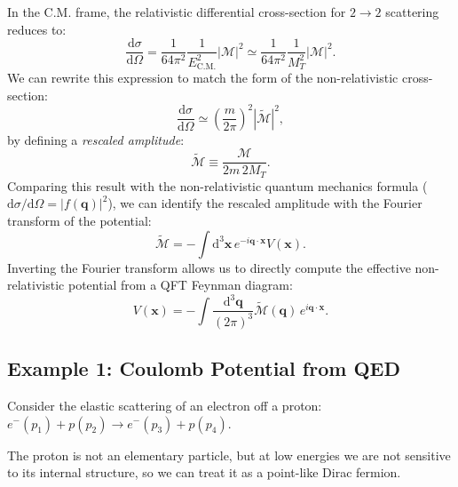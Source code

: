 In the C.M. frame, the relativistic differential cross-section for $2 \to 2$ scattering reduces to:
\[
    \frac{\mathrm{d}\sigma}{\mathrm{d}\Omega} = \frac{1}{64\pi^2} \frac{1}{E_{\text{C.M.}}^2} |\mathcal{M}|^2 \simeq \frac{1}{64\pi^2} \frac{1}{M_T^2} |\mathcal{M}|^2.
\]
We can rewrite this expression to match the form of the non-relativistic cross-section:
\[
    \frac{\mathrm{d}\sigma}{\mathrm{d}\Omega} \simeq \left(\frac{m}{2\pi}\right)^2 |\tilde{\mathcal{M}}|^2,
\]
by defining a \textit{rescaled amplitude}:
\[
    \tilde{\mathcal{M}} \equiv \frac{\mathcal{M}}{2m \, 2M_T}.
\]
Comparing this result with the non-relativistic quantum mechanics formula ($\mathrm{d}\sigma/\mathrm{d}\Omega = |f(\mathbf{q})|^2$), we can identify the rescaled amplitude with the Fourier transform of the potential:
\[
    \tilde{\mathcal{M}} = -\int \mathrm{d}^3\mathbf{x} \, e^{-i\mathbf{q}\cdot\mathbf{x}} V(\mathbf{x}).
\]
Inverting the Fourier transform allows us to directly compute the effective non-relativistic potential from a QFT Feynman diagram:
\[
    V(\mathbf{x}) = -\int \frac{\mathrm{d}^3\mathbf{q}}{(2\pi)^3} \tilde{\mathcal{M}}(\mathbf{q}) \, e^{i\mathbf{q}\cdot\mathbf{x}}.
\]

\subsection{Example 1: Coulomb Potential from QED}
Consider the elastic scattering of an electron off a proton: $e^-(p_1) + p(p_2) \to e^-(p_3) + p(p_4)$.
\begin{remark}
    The proton is not an elementary particle, but at low energies we are not sensitive to its internal structure, so we can treat it as a point-like Dirac fermion.
\end{remark}


